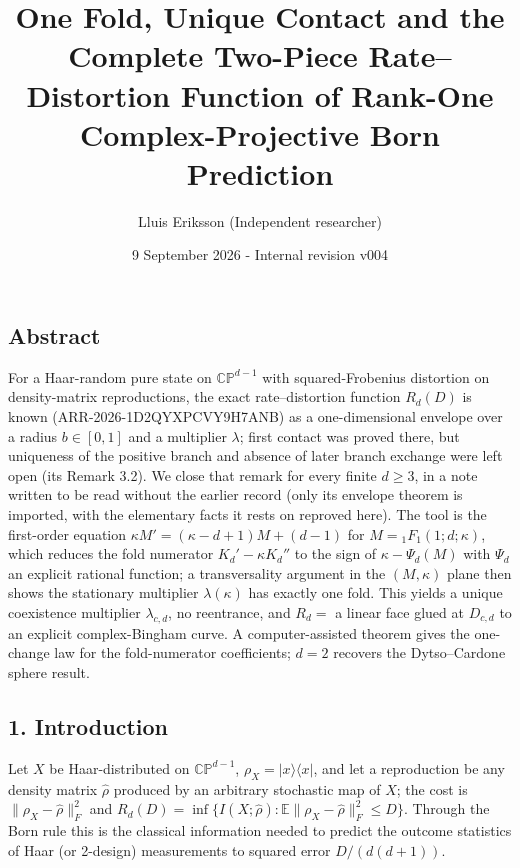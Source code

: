 \documentclass[
  11pt,
  a4paper,
]{article}
\title{One Fold, Unique Contact and the Complete Two-Piece
Rate--Distortion Function of Rank-One Complex-Projective Born
Prediction}
\author{Lluis Eriksson (Independent researcher)}
\date{9 September 2026 - Internal revision v004}
\begin{document}
\maketitle

\subsection{Abstract}\label{abstract}

For a Haar-random pure state on \(\mathbb{CP}^{d-1}\) with
squared-Frobenius distortion on density-matrix reproductions, the exact
rate--distortion function \(R_d(D)\) is known
(ARR-2026-1D2QYXPCVY9H7ANB) as a one-dimensional envelope over a radius
\(b\in[0,\allowbreak{}1]\) and a multiplier \(\lambda\); first contact was proved
there, but uniqueness of the positive branch and absence of later branch
exchange were left open (its Remark 3.2). We close that remark for every
finite \(d\ge3\), in a note written to be read without the earlier
record (only its envelope theorem is imported, with the elementary facts
it rests on reproved here). The tool is the first-order equation
\(\kappa M'=(\kappa-d+1)M+(d-1)\) for \(M={}_1F_1(1;\allowbreak{}d;\allowbreak{}\kappa)\), which
reduces the fold numerator \(K_d'-\kappa K_d''\) to the sign of
\(\kappa-\Psi_d(M)\) with \(\Psi_d\) an explicit rational function; a
transversality argument in the \((M,\allowbreak{}\kappa)\) plane then shows the
stationary multiplier \(\lambda(\kappa)\) has exactly one fold. This
yields a unique coexistence multiplier \(\lambda_{c,\allowbreak{}d}\), no reentrance,
and \(R_d=\) a linear face glued at \(D_{c,\allowbreak{}d}\) to an explicit
complex-Bingham curve. A computer-assisted theorem gives the one-change
law for the fold-numerator coefficients; \(d=2\) recovers the
Dytso--Cardone sphere result.

\subsection{1. Introduction}\label{introduction}

Let \(X\) be Haar-distributed on \(\mathbb{CP}^{d-1}\),
\(\rho_X=|x\rangle\langle x|\), and let a reproduction be any density
matrix \(\hat\rho\) produced by an arbitrary stochastic map of \(X\);
the cost is \(\|\rho_X-\hat\rho\|_F^2\) and
\(R_d(D)=\inf\{I(X;\allowbreak{}\hat\rho):\mathbb{E}\|\rho_X-\hat\rho\|_F^2\le D\}\).
Through the Born rule this is the classical information needed to
predict the outcome statistics of Haar (or 2-design) measurements to
squared error \(D/(d(d+1))\).
\end{document}
